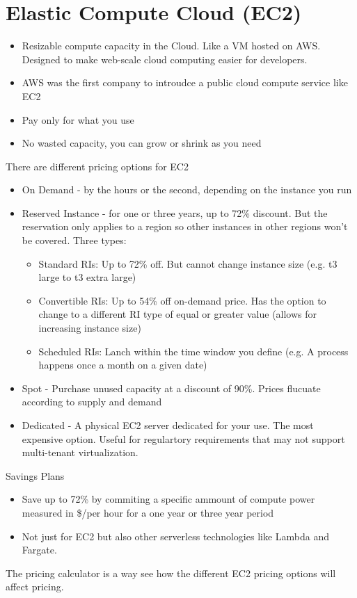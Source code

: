 \documentclass{article}%
\begin{document}
\section{Elastic Compute Cloud (EC2)}
\begin{itemize}
    \item Resizable compute capacity in the Cloud. Like a VM hosted on AWS. Designed to make web-scale cloud computing easier for developers.
    \item AWS was the first company to introudce a public cloud compute service like EC2
    \item Pay only for what you use
    \item No wasted capacity, you can grow or shrink as you need
\end{itemize}
There are different pricing options for EC2
\begin{itemize}
    \item On Demand - by the hours or the second, depending on the instance you run
    \item Reserved Instance - for one or three years, up to 72\% discount. But the reservation only applies to a region so other instances in other regions won't be covered. Three types:
    \begin{itemize}
        \item Standard RIs: Up to 72\% off. But cannot change instance size (e.g. t3 large to t3 extra large)
        \item Convertible RIs: Up to 54\% off on-demand price. Has the option to change to a different RI type of equal or greater value (allows for increasing instance size)
        \item Scheduled RIs: Lanch within the time window you define (e.g. A process happens once a month on a given date)
    \end{itemize} 
    \item Spot - Purchase unused capacity at a discount of 90\%. Prices flucuate according to supply and demand 
    \item Dedicated - A physical EC2 server dedicated for your use. The most expensive option. Useful for regulartory requirements that may not support multi-tenant virtualization.
\end{itemize}

Savings Plans
\begin{itemize}
    \item Save up to 72\% by commiting a specific ammount of compute power measured in \$/per hour for a one year or three year period
    \item Not just for EC2 but also other serverless technologies like Lambda and Fargate.
\end{itemize}
The pricing calculator is a way see how the different EC2 pricing options will affect pricing.
\end{document}
